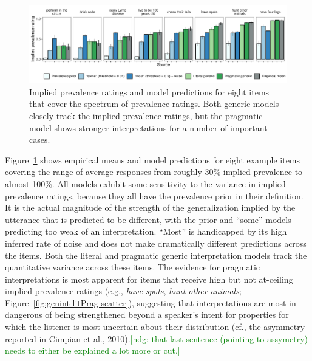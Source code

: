 \documentclass[floatsintext,doc]{apa6}
\newcommand{\ndg}[1]{{\textcolor{Green}{[ndg: #1]}}}
\begin{document}
\begin{figure}
\centering
\includegraphics{genint_files/figure-latex/genint-modelingResults-bars-1.pdf}
\caption{Implied prevalence ratings and model predictions for eight items that cover the spectrum of prevalence ratings. 
Both generic models closely track the implied prevalence ratings, but the pragmatic model shows stronger interpretations for a number of important cases.}
\label{fig:genint-modelingResults-bars}
\end{figure}


Figure~\ref{fig:genint-modelingResults-bars} shows empirical means and model predictions for eight example items covering the range of average responses from roughly 30\% implied prevalence to almost 100\%.
All models exhibit some sensitivity to the variance in implied prevalence ratings, because they all have the prevalence prior in their definition.
It is the actual magnitude of the strength of the generalization implied by the utterance that is predicted to be different, with the prior and \enquote{some} models predicting too weak of an interpretation.
\enquote{Most} is handicapped by its high inferred rate of noise and does not make dramatically different predictions across the items.
Both the literal and pragmatic generic interpretation models track the quantitative variance across these items.
The evidence for pragmatic interpretations is most apparent for items that receive high but not at-ceiling implied prevalence ratings (e.g., \emph{have spots}, \emph{hunt other animals}; Figure~\ref{fig:genint-litPrag-scatter}), suggesting that interpretations are most in dangerous of being strengthened beyond a speaker's intent for properties for which the listener is most uncertain about their distribution (cf., the asymmetry reported in Cimpian et al., 2010).\ndg{that last sentence (pointing to assymetry) needs to either be explained a lot more or cut.}

\end{document}
